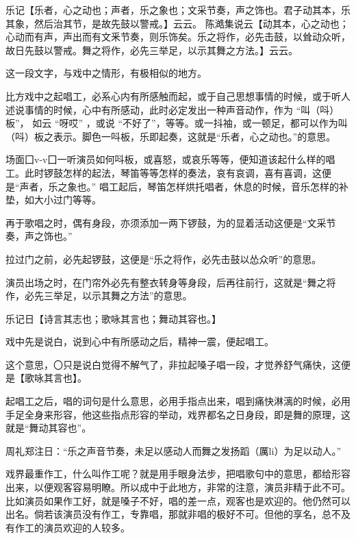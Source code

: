 \documentclass{zhvt-classic}
\begin{document}
\begin{preface}
  乐记【乐者，心之动也；声者，乐之象也；文采节奏，声之饰也。君子动其本，乐其象，然后治其节，是故先鼓以警戒。】云云。
  陈澔集说云【动其本，心之动也；心动而有声，声出而有文釆节奏，则乐饰矣。乐之将作，必先击鼓，以耸动众听，故日先鼓以警戒。舞之将作，必先三举足，以示其舞之方法。】云云。
\end{preface}

这一段文字，与戏中之情形，有极相似的地方。

比方戏中之起唱工，必系心内有所感触而起，或于自己思想事情的时候，或于听人述说事情的时候，心中有所感动，此时必定发出一种声音动作，作为 “叫（呌）板”， 如云 “呀哎” ，或说 “不好了”，等等。或一抖袖，或一顿足，都可以作为叫（呌）板之表示。脚色一呌板，乐即起奏，这就是“乐者，心之动也。”的意思。

场面囗v-v囗一听演员如何呌板，或喜怒，或哀乐等等，便知道该起什么样的唱工。此时锣鼓怎样的起法，琴笛等等怎样的奏法，哀有哀调，喜有喜调，这便是“声者，乐之象也。” 唱工起后，琴笛怎样烘托唱者，休息的时候，音乐怎样的补垫，如大小过门等等。

再于歌唱之时，偶有身段，亦须添加一两下锣鼓，为的显着活动这便是“文采节奏，声之饰也。”

拉过门之前，必先起锣鼓，这便是“乐之将作，必先击鼓以怂众听”的意思。

演员出场之时，在门帘外必先有整衣转身等身段，后再往前行，这就是“舞之将作，必先三举足，以示其舞之方法”的意思。

\begin{preface}
  乐记日【诗言其志也；歌咏其言也；舞动其容也。】
\end{preface}

戏中先是说白，说到心中有所感动之后，精神一震，便起唱工。

这个意思，〇只是说白觉得不解气了，非拉起嗓子唱一段，才觉养舒气痛快，这便是【歌咏其言也】。

起唱工之后，唱的词句是什么意思，必用手指点出来，唱到痛快淋漓的时候，必用手足全身来形容，他这些指点形容的举动，戏界都名之日身段，即是舞的原理，这就是“舞动其容也”。

\begin{preface}
  周礼郑注日：“乐之声音节奏，未足以感动人而舞之发扬蹈（厲li）为足以动人。”
\end{preface}

戏界最重作工，什么叫作工呢？就是用手眼身法步，把唱歌句中的意思，都给形容出来，以便观客容易明瞭。所以成中于此地方，非常的注意，演员非精于此不可。比如演员如果作工好，就是嗓子不好，唱的差一点，观客也是欢迎的。他仍然可以出名。倘若该演员没有作工，专靠唱，那就非唱的极好不可。但他的享名，总不及有作工的演员欢迎的人较多。
\end{document}
